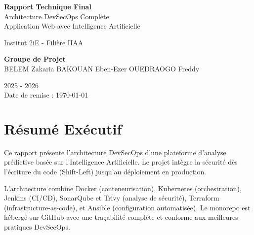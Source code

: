 \documentclass[12pt,a4paper]{article}
\begin{document}
\begin{titlepage}
  \pagecolor{darkblue}
  \color{white}
  \vspace*{0.5cm}
  
  \centering
  {\huge\bfseries Rapport Technique Final}\\[0.3cm]
  {\Large Architecture DevSecOps Complète}\\[0.2cm]
  {\large Application Web avec Intelligence Artificielle}
  
  \vspace{1.5cm}
  {\large Institut 2iE - Filière IIAA}
  
  \vspace{2cm}
  {\large\bfseries Groupe de Projet}\\
  BELEM Zakaria \quad BAKOUAN Eben-Ezer \quad OUEDRAOGO Freddy
  
  \vfill
  
  {\small 2025 - 2026}\\
  {\normalsize Date de remise : \today}
\end{titlepage}

\pagecolor{white}
\color{black}

\clearpage
\setcounter{page}{2}
\tableofcontents

\clearpage
\section*{Résumé Exécutif}

Ce rapport présente l'architecture DevSecOps d'une plateforme d'analyse prédictive basée sur l'Intelligence Artificielle. Le projet intègre la sécurité dès l'écriture du code (Shift-Left) jusqu'au déploiement en production.

L'architecture combine Docker (conteneurisation), Kubernetes (orchestration), Jenkins (CI/CD), SonarQube et Trivy (analyse de sécurité), Terraform (infrastructure-as-code), et Ansible (configuration automatisée). Le monorepo est hébergé sur GitHub avec une traçabilité complète et conforme aux meilleures pratiques DevSecOps.

\clearpage
\end{document}
